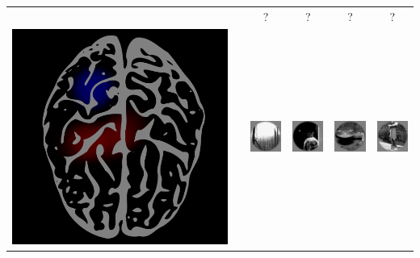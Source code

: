 \documentclass{beamer}
\begin{document}
\begin{frame}
\begin{center}
\begin{tabular}{c|c|cccc}
\hline
 & & ? & ? & ? & ? \\
\includegraphics[scale = 0.035]{brain8.png} & \hspace{0.5in} 
& \includegraphics[scale = .26]{img5.png}
& \includegraphics[scale = .26]{img6.png}
& \includegraphics[scale = .26]{img7.png}
& \includegraphics[scale = .26]{img8.png}\\
\hline
\end{tabular}
\end{center}
\end{frame}
\end{document}

